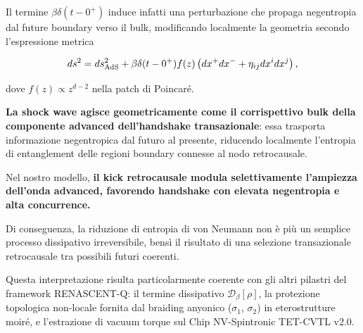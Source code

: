 \documentclass[11pt,a4paper]{article}
\theoremstyle{plain}
\theoremstyle{definition}
\begin{document}
Il termine $\beta \delta(t-0^+)$ induce infatti una perturbazione che propaga negentropia dal future boundary verso il bulk, modificando localmente la geometria secondo l'espressione metrica

\vspace{0.3cm}

\begin{tcolorbox}[
  colback=blue!3!white, 
  colframe=blue!80!black, 
  title=Shock wave retrocausale in AdS/CFT, 
  fonttitle=\bfseries,
  breakable,
  enhanced,
  width=\textwidth,
  boxrule=0.9pt,
  arc=6pt
]
\begin{equation}
ds^2 = ds^2_{\rm AdS} + \beta \delta(t-0^+) f(z) \left( dx^+ dx^- + \eta_{ij} dx^i dx^j \right),
\label{eq:ads_shock_wave}
\end{equation}
\end{tcolorbox}

\vspace{0.3cm}

dove $f(z) \propto z^{d-2}$ nella patch di Poincaré. 

\vspace{0.4cm}

\textbf{La shock wave agisce geometricamente come il corrispettivo bulk della componente advanced dell'handshake transazionale}: essa trasporta informazione negentropica dal futuro al presente, riducendo localmente l'entropia di entanglement delle regioni boundary connesse al nodo retrocausale.


\vspace{0.3cm}

Nel nostro modello, \textbf{il kick retrocausale modula selettivamente l'ampiezza dell'onda advanced, favorendo handshake con elevata negentropia e alta concurrence.} 

\vspace{0.5cm}


Di conseguenza, la riduzione di entropia di von Neumann non è più un semplice processo dissipativo irreversibile, bensì il risultato di una selezione transazionale retrocausale tra possibili futuri coerenti. 


\vspace{0.6cm}

Questa interpretazione risulta particolarmente coerente con gli altri pilastri del framework RENASCENT-Q: il termine dissipativo $\mathcal{D}_\beta[\rho]$, la protezione topologica non-locale fornita dal braiding anyonico ($\sigma_1$, $\sigma_2$) in eterostrutture moiré, e l'estrazione di vacuum torque sul Chip NV-Spintronic TET-CVTL v2.0. 
\end{document}
